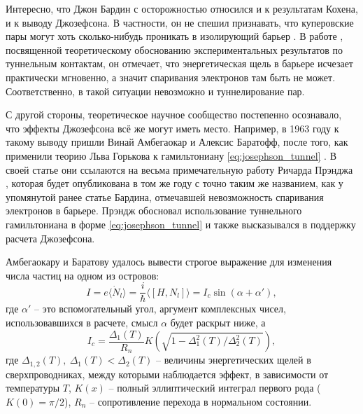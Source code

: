\documentclass[14pt, a4paper]{extreport}
\numberwithin{equation}{section}
\begin{document}
Интересно, что Джон Бардин с осторожностью относился и к результатам Кохена, и к выводу Джозефсона. В частности, он не спешил признавать, что куперовские пары могут хоть сколько-нибудь проникать в изолирующий барьер \cite{josephsonnobel}. В работе \cite{bardeen1961tunnelling}, посвященной теоретическому обоснованию экспериментальных результатов по туннельным контактам, он отмечает, что энергетическая щель в барьере исчезает практически мгновенно, а значит спаривания электронов там быть не может. Соответственно, в такой ситуации невозможно и туннелирование пар.

С другой стороны, теоретическое научное сообщество постепенно осознавало, что эффекты Джозефсона всё же могут иметь место. Например, в 1963 году к такому выводу пришли Винай Амбегаокар и Алексис Баратофф, после того, как применили теорию Льва Горькова к гамильтониану \eqref{eq:josephson_tunnel} \cite{ambegaokar1963tunneling}. В своей статье они ссылаются на весьма примечательную работу Ричарда Прэнджа \cite{prange1963tunneling}, которая будет опубликована в том же году с точно таким же названием, как у упомянутой ранее статье Бардина, отмечавшей невозможность спаривания электронов в барьере. Прэндж обосновал использование туннельного гамильтониана в форме \eqref{eq:josephson_tunnel} и также высказывался в поддержку расчета Джозефсона.

Амбегаокару и Баратову удалось вывести строгое выражение для изменения числа частиц на одном из островов:
\begin{equation}
	I = e \langle \dot N_l \rangle =  \frac{i}{\hbar}\langle [H, N_l] \rangle = I_c \sin(\alpha + \alpha'),
\end{equation}
где $\alpha'$ -- это вспомогательный угол, аргумент комплексных чисел, использовавшихся в расчете, смысл $\alpha$ будет раскрыт ниже, а 
\begin{equation}
	I_c = \frac{\Delta_1(T)}{R_n} K \left(\sqrt{1 - \Delta_1^2(T)/\Delta_2^2(T)}\right),
\end{equation}
где $\Delta_{1,2}(T),\ \Delta_1(T) < \Delta_2(T)$ -- величины энергетических щелей в сверхпроводниках, между которыми наблюдается эффект, в зависимости от температуры $T$, $K(x)$ -- полный эллиптический интеграл первого рода ($K(0) = \pi/2$), $R_n$ -- сопротивление перехода в нормальном состоянии.
\end{document}
